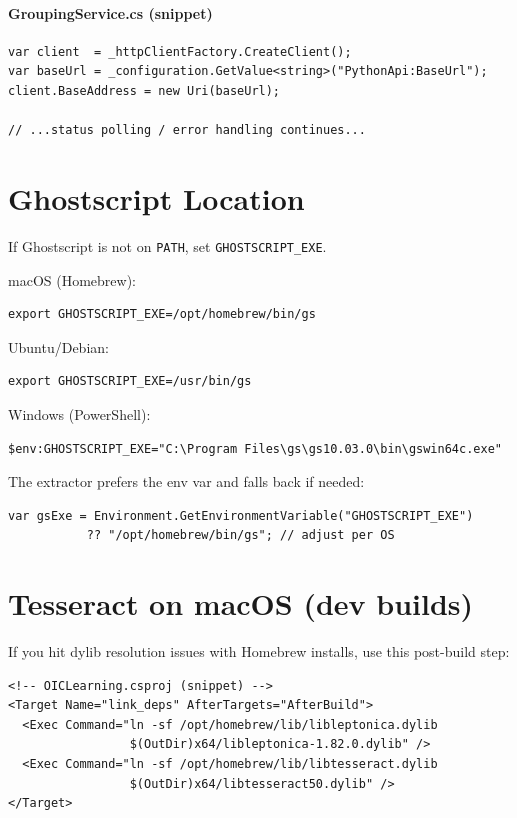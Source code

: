 \documentclass[ms,twoside,print]{nuthesis}
\begin{document}
\paragraph{GroupingService.cs (snippet)}
\begin{lstlisting}[language={[Sharp]C}]
var client  = _httpClientFactory.CreateClient();
var baseUrl = _configuration.GetValue<string>("PythonApi:BaseUrl");
client.BaseAddress = new Uri(baseUrl);

// ...status polling / error handling continues...
\end{lstlisting}

\section{Ghostscript Location}
If Ghostscript is not on \texttt{PATH}, set \texttt{GHOSTSCRIPT\_EXE}.

\noindent macOS (Homebrew):
\begin{lstlisting}
export GHOSTSCRIPT_EXE=/opt/homebrew/bin/gs
\end{lstlisting}

\noindent Ubuntu/Debian:
\begin{lstlisting}
export GHOSTSCRIPT_EXE=/usr/bin/gs
\end{lstlisting}

\noindent Windows (PowerShell):
\begin{lstlisting}
$env:GHOSTSCRIPT_EXE="C:\Program Files\gs\gs10.03.0\bin\gswin64c.exe"
\end{lstlisting}

\noindent The extractor prefers the env var and falls back if needed:
\begin{lstlisting}[language={[Sharp]C}]
var gsExe = Environment.GetEnvironmentVariable("GHOSTSCRIPT_EXE")
           ?? "/opt/homebrew/bin/gs"; // adjust per OS
\end{lstlisting}

\section{Tesseract on macOS (dev builds)}
If you hit dylib resolution issues with Homebrew installs, use this post-build step:

\begin{lstlisting}
<!-- OICLearning.csproj (snippet) -->
<Target Name="link_deps" AfterTargets="AfterBuild">
  <Exec Command="ln -sf /opt/homebrew/lib/libleptonica.dylib
                 $(OutDir)x64/libleptonica-1.82.0.dylib" />
  <Exec Command="ln -sf /opt/homebrew/lib/libtesseract.dylib
                 $(OutDir)x64/libtesseract50.dylib" />
</Target>
\end{lstlisting}
\end{document}
